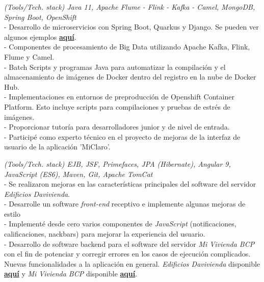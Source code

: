 \documentclass[]{CV-JuanCamiloFlorez}
\begin{document}
\begin{minipage}[t]{0.66\textwidth}
    \textit{(Tools/Tech. stack) Java 11, Apache Flume - Flink - Kafka - Camel, MongoDB, Spring Boot, OpenShift} \\
        - Desarrollo de microservicios con Spring Boot, Quarkus y Django. Se pueden ver algunos ejemplos \textbf{\href{https://github.com/VanJFlorez/flink-kafka-fraud-detection}{aquí}}. \\
        - Componentes de procesamiento de Big Data utilizando Apache Kafka, Flink, Flume y Camel. \\
        - Batch Scripts y programas Java para automatizar la compilación y el almacenamiento de imágenes de Docker dentro del registro en la nube de Docker Hub. \\
        - Implementaciones en entornos de preproducción de Openshift Container Platform. Esto incluye scripts para compilaciones y pruebas de estrés de imágenes. \\
        - Proporcionar tutoría para desarrolladores junior y de nivel de entrada. \\
        - Participé como experto técnico en el proyecto de mejoras de la interfaz de usuario de la aplicación 'MiClaro'. \\
        \sectionsep

    \textit{(Tools/Tech. stack) EJB, JSF, Primefaces, JPA (Hibernate), Angular 9, JavaScript (ES6), Maven, Git, Apache TomCat} \\
        - Se realizaron mejoras en las características principales del software del servidor \textit{Edificios Davivienda}. \\
        - Desarrolle un software \textit{front-end} receptivo e implemente algunas mejoras de estilo \\
        - Implementé desde cero varios componentes de \textit{JavaScript} (notificaciones, calificaciones, nackbars) para mejorar la experiencia del usuario. \\
        - Desarrollo de software backend para el software del servidor \textit{Mi Vivienda BCP} con el fin de potenciar y corregir errores en los casos de ejecución complicados. Nuevas funcionalidades a la aplicación en general. \textit{Edificios Davivienda} disponible \textbf{\href{https://www.edificiosdavivienda.com}{aquí}} y \textit{Mi Vivienda BCP} disponible \textbf{\href{https://www.miviviendabcp.com.bo}{aquí}}. \\
        \sectionsep


\end{minipage}
\end{document}
